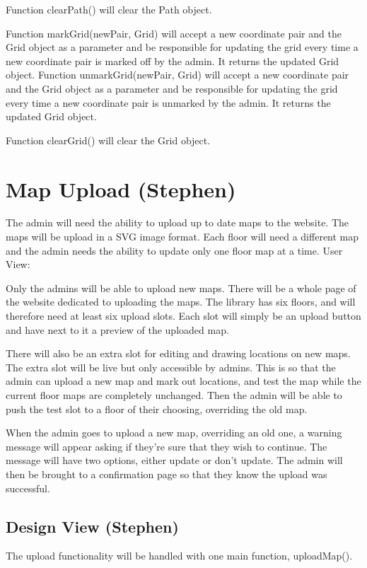 \documentclass[letterpaper,10pt,titlepage, onecolumn, compsoc]{IEEEtran}
\begin{document}
Function clearPath() will clear the Path object.
 
Function markGrid(newPair, Grid) will accept a new coordinate pair and the Grid object as a parameter and be responsible for updating the grid every time a new coordinate pair is marked off by the admin. It returns the updated Grid object.
Function unmarkGrid(newPair, Grid) will accept a new coordinate pair and the Grid object as a parameter and be responsible for updating the grid every time a new coordinate pair is unmarked by the admin. It returns the updated Grid object.
 
Function clearGrid() will clear the Grid object.  

\section{Map Upload (Stephen)}
The admin will need the ability to upload up to date maps to the website. The maps will be upload in a SVG image format. Each floor will need a different map and the admin needs the ability to update only one floor map at a time.  
User View:

Only the admins will be able to upload new maps. There will be a whole page of the website dedicated to uploading the maps. The library has six floors, and will therefore need at least six upload slots. Each slot will simply be an upload button and have next to it a preview of the uploaded map.

There will also be an extra slot for editing and drawing locations on new maps. The extra slot will be live but only accessible by admins. This is so that the admin can upload a new map and mark out locations, and test the map while the current floor maps are completely unchanged. Then the admin will be able to push the test slot to a floor of their choosing, overriding the old map.  

When the admin goes to upload a new map, overriding an old one, a warning message will appear asking if they’re sure that they wish to continue. The message will have two options, either update or don’t update. The admin will then be brought to a confirmation page so that they know the upload was successful.

\subsection{Design View (Stephen)}
The upload functionality will be handled with one main function, uploadMap().
\end{document}
